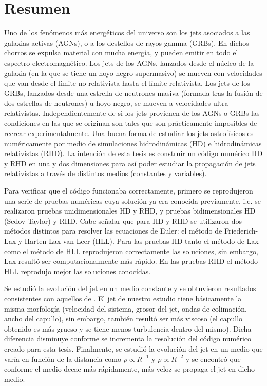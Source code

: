 \documentclass[12pt,a4paper]{book}
\begin{document}
\chapter*{Resumen} %
Uno de los fenómenos más energéticos del universo son los jets asociados a las galaxias activas (AGNs), o a los destellos de rayos gamma (GRBs). En dichos chorros se expulsa material con 
mucha energía, y pueden emitir en todo el espectro electromagnético. Los jets de los AGNs, lanzados desde el núcleo de la galaxia (en la que se tiene un hoyo negro supermasivo) se mueven con 
velocidades que van desde el 
límite no relativista hasta el límite relativista. Los jets de los GRBs, lanzados desde una estrella de neutrones masiva (formada tras la fusión de dos estrellas de neutrones) u hoyo negro, se mueven a velocidades 
ultra relativistas. Independientemente de si los jets provienen de los AGNs o GRBs las condiciones en las que se originan son tales que son prácticamente imposibles de recrear experimentalmente.
Una buena forma de estudiar los jets astrofísicos es numéricamente por medio de simulaciones hidrodinámicas (HD) e hidrodinámicas relativistas (RHD). La intención de esta tesis es construir un 
código numérico HD y RHD en una y dos dimensiones para así poder estudiar la propagación de jets relativistas a través de distintos medios (constantes y variables).

Para verificar que el código funcionaba correctamente, primero se reprodujeron una serie de pruebas numéricas cuya solución ya era conocida previamente, i.e. se realizaron pruebas unidimensionales 
HD y RHD, y pruebas bidimensionales HD (Sedov-Taylor) y RHD. Cabe señalar que para HD y RHD se utilizaron dos métodos distintos para resolver las ecuaciones de Euler: el método de Friederich-Lax y 
Harten-Lax-van-Leer (HLL). Para las pruebas HD tanto el método de Lax como el método de HLL reprodujeron correctamente las soluciones, sin embargo, Lax resultó ser computacionalmente más rápido. En las pruebas RHD el método HLL reprodujo mejor las soluciones conocidas.

Se estudió la evolución del jet en un medio constante y se obtuvieron resultados consistentes con aquellos de \citet{MB-HLLC-I}. El jet de nuestro estudio tiene básicamente la misma morfología (velocidad del sistema, 
grosor del jet, ondas de colimación, ancho del capullo), sin embargo, también resultó ser más viscoso (el capullo obtenido es más grueso y se tiene menos turbulencia dentro del mismo). Dicha diferencia disminuye conforme 
se incrementa la resolución del código numérico creado para esta tesis. Finalmente, se estudió la evolución del jet en un medio que varía en función de la distancia como $\rho \propto R^{-1}$ y $\rho \propto R^{-2}$ y 
se encontró que conforme el medio decae más rápidamente, más veloz se propaga el jet en dicho medio.
\end{document}
